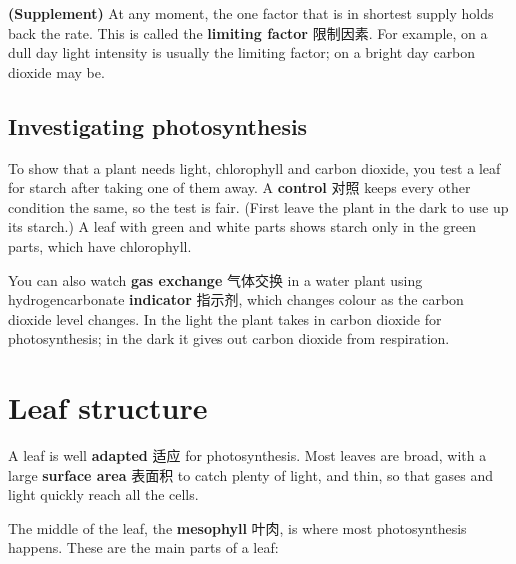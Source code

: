 \documentclass[11pt]{article}
\begin{document}
\textbf{(Supplement)} At any moment, the one factor that is in shortest supply holds back the rate. This is called the \textbf{limiting factor} 限制因素. For example, on a dull day light intensity is usually the limiting factor; on a bright day carbon dioxide may be.

\subsection*{Investigating photosynthesis}

To show that a plant needs light, chlorophyll and carbon dioxide, you test a leaf for starch after taking one of them away. A \textbf{control} 对照 keeps every other condition the same, so the test is fair. (First leave the plant in the dark to use up its starch.) A leaf with green and white parts shows starch only in the green parts, which have chlorophyll.

You can also watch \textbf{gas exchange} 气体交换 in a water plant using hydrogencarbonate \textbf{indicator} 指示剂, which changes colour as the carbon dioxide level changes. In the light the plant takes in carbon dioxide for photosynthesis; in the dark it gives out carbon dioxide from respiration.

\section*{Leaf structure}

A leaf is well \textbf{adapted} 适应 for photosynthesis. Most leaves are broad, with a large \textbf{surface area} 表面积 to catch plenty of light, and thin, so that gases and light quickly reach all the cells.

The middle of the leaf, the \textbf{mesophyll} 叶肉, is where most photosynthesis happens. These are the main parts of a leaf:
\end{document}
